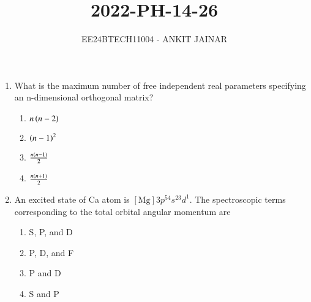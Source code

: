 \documentclass[journal,12pt,onecolumn]{IEEEtran}
\theoremstyle{remark}
\begin{document}

\vspace{3cm}

\title{2022-PH-14-26}
\author{EE24BTECH11004 - ANKIT JAINAR}
\maketitle
\bigskip

\renewcommand{\thefigure}{\theenumi}
\renewcommand{\thetable}{\theenumi}
\setlength{\columnsep}{2.5em}
\begin{enumerate}
    \item What is the maximum number of free independent real parameters specifying an n-dimensional orthogonal matrix?
    \begin{enumerate}
        \item $n\left(n-2\right)$
        \item $\left(n-1\right)^2$
        \item $\frac{n\left(n-1\right)}{2}$
        \item $\frac{n\left(n+1\right)}{2}$
    \end{enumerate}

    \item An excited state of Ca atom is $[\text{Mg}]3p^54s^23d^1$. The spectroscopic terms corresponding to the total orbital angular momentum are
    \begin{enumerate}
        \item S, P, and D
        \item P, D, and F
        \item P and D
        \item S and P
    \end{enumerate}


\end{enumerate}
\end{document}
